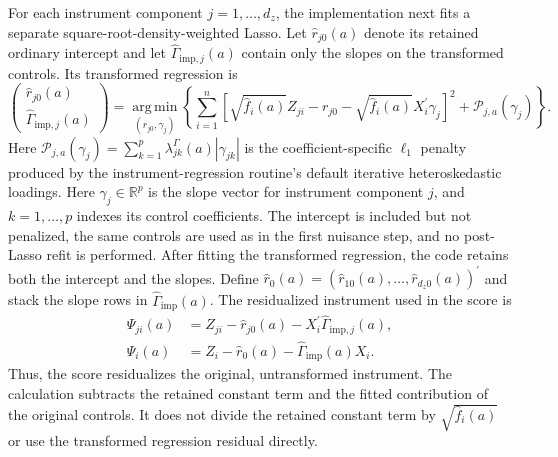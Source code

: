 For each instrument component $j=1,\ldots,d_z$, the implementation next fits a separate square-root-density-weighted Lasso. Let $\widehat r_{j0}(a)$ denote its retained ordinary intercept and let $\widehat\Gamma_{\mathrm{imp},j}(a)$ contain only the slopes on the transformed controls. Its transformed regression is
\begin{equation}
    \begin{pmatrix}
        \widehat r_{j0}(a)\\
        \widehat\Gamma_{\mathrm{imp},j}(a)
    \end{pmatrix}
    =
    \operatorname*{arg\,min}_{(r_{j0},\gamma_j)}
    \left\{
        \sum_{i=1}^{n}
        \left[
            \sqrt{\widehat f_i(a)}Z_{ji}
            -r_{j0}
            -\sqrt{\widehat f_i(a)}X_i^{\prime}\gamma_j
        \right]^2
        +\mathcal{P}_{j,a}(\gamma_j)
    \right\}.
    \label{eq:dml-residualization-implementation}
\end{equation}
Here $\mathcal{P}_{j,a}(\gamma_j)=\sum_{k=1}^{p}\lambda^{\Gamma}_{jk}(a)|\gamma_{jk}|$ is the coefficient-specific $\ell_1$ penalty produced by the instrument-regression routine's default iterative heteroskedastic loadings. Here $\gamma_j\in\mathbb{R}^{p}$ is the slope vector for instrument component $j$, and $k=1,\ldots,p$ indexes its control coefficients. The intercept is included but not penalized, the same controls are used as in the first nuisance step, and no post-Lasso refit is performed. After fitting the transformed regression, the code retains both the intercept and the slopes. Define $\widehat r_0(a)=(\widehat r_{10}(a),\ldots,\widehat r_{d_z0}(a))^{\prime}$ and stack the slope rows in $\widehat\Gamma_{\mathrm{imp}}(a)$. The residualized instrument used in the score is
\begin{equation}
    \begin{aligned}
        \widehat\Psi_{ji}(a)
        &=
        Z_{ji}-\widehat r_{j0}(a)-X_i^{\prime}\widehat\Gamma_{\mathrm{imp},j}(a),\\
        \widehat\Psi_i(a)
        &=
        Z_i-\widehat r_0(a)-\widehat\Gamma_{\mathrm{imp}}(a)X_i.
    \end{aligned}
    \label{eq:estimated-residualized-instrument}
\end{equation}
Thus, the score residualizes the original, untransformed instrument. The calculation subtracts the retained constant term and the fitted contribution of the original controls. It does not divide the retained constant term by $\sqrt{\widehat f_i(a)}$ or use the transformed regression residual directly.

